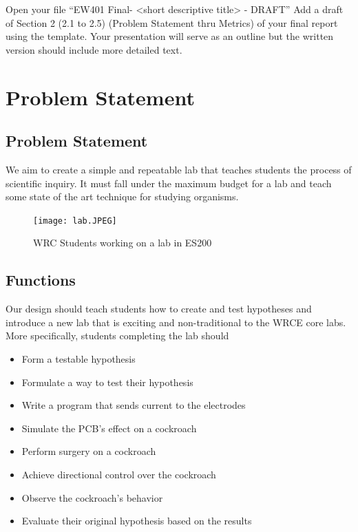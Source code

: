\documentclass{article}
\begin{document}
Open your file “EW401 Final- <short descriptive title> - DRAFT”
Add a draft of Section 2 (2.1 to 2.5)  (Problem Statement thru Metrics) of your final report using the template. Your presentation will serve as an outline but the written version should include
more detailed text. 

\section{Problem Statement}

\subsection{Problem Statement}
\par We aim to create a simple and repeatable lab that teaches students the process of scientific inquiry. It must fall under the maximum budget for a lab and teach some state of the art technique for studying organisms.

\begin{figure}[ht!]
\centering
\texttt{[image: lab.JPEG]}
\caption{WRC Students working on a lab in ES200}
\label{fig:lab}
\end{figure}

\subsection{Functions}
\par Our design should teach students how to create and test hypotheses and introduce a new lab that is exciting and non-traditional to the WRCE core labs. More specifically, students completing the lab should

\begin{itemize}
  \item Form a testable hypothesis
  \item Formulate a way to test their hypothesis
  \item Write a program that sends current to the electrodes
  \item Simulate the PCB's effect on a cockroach
  \item Perform surgery on a cockroach
  \item Achieve directional control over the cockroach
  \item Observe the cockroach's behavior
  \item Evaluate their original hypothesis based on the results
\end{itemize}
\end{document}
